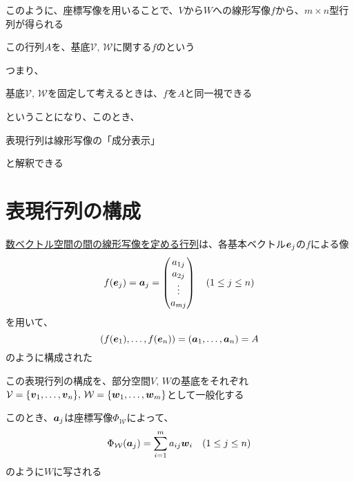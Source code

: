 \documentclass[../../../topic_linear-algebra]{subfiles}
\begin{document}
\sectionline

このように、座標写像を用いることで、$V$から$W$への線形写像$f$から、$m \times n$型行列が得られる

この行列$A$を、基底$\mathcal{V}, \, \mathcal{W}$に関する$f$のという

\br

つまり、
\begin{shaded}
  基底$\mathcal{V}, \, \mathcal{W}$を固定して考えるときは、$f$を$A$と同一視できる
\end{shaded}
ということになり、このとき、
\begin{shaded}
  表現行列は線形写像の「成分表示」
\end{shaded}
と解釈できる

\sectionline
\section{表現行列の構成}\label{sec:construction-of-matrix-rep}

\hyperref[sec:matrix-rep-of-linear-maps]{数ベクトル空間の間の線形写像を定める行列}は、各基本ベクトル$\vb*{e}_j$の$f$による像
\begin{equation*}
  f(\vb*{e}_j) = \vb*{a}_j = \begin{pmatrix}
    a_{1j} \\
    a_{2j} \\
    \vdots \\
    a_{mj}
  \end{pmatrix} \quad (1 \leq j \leq n)
\end{equation*}
を用いて、
\begin{equation*}
  \left( f(\vb*{e}_1), \ldots, f(\vb*{e}_n) \right) = \left( \vb*{a}_1, \ldots, \vb*{a}_n \right) = A
\end{equation*}
のように構成された

\br

この表現行列の構成を、部分空間$V,\,W$の基底をそれぞれ$\mathcal{V} = \{ \vb*{v}_1,\ldots, \vb*{v}_n\}, \, \mathcal{W} = \{\vb*{w}_1, \ldots, \vb*{w}_m\}$として一般化する

\br

このとき、$\vb*{a}_j$は座標写像$\Phi_{\mathcal{W}}$によって、
\begin{equation*}
  \Phi_{\mathcal{W}}(\vb*{a}_j) = \sum_{i=1}^m a_{ij} \vb*{w}_i \quad (1 \leq j \leq n)
\end{equation*}
のように$W$に写される
\end{document}
